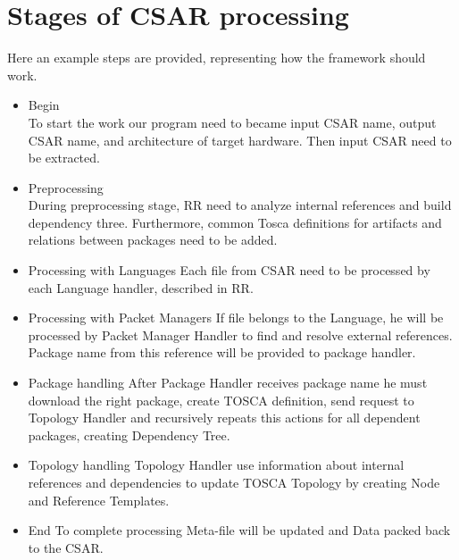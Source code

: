 \section*{Stages of CSAR processing}
Here an example steps are provided, representing how the framework should work.
\begin{itemize}  
	\item Begin  \\
	To start the work our program need to became input CSAR name, output CSAR name, and architecture of target hardware. 
	Then input CSAR need to be extracted.
	\item Preprocessing\\
	During preprocessing stage, RR need to analyze internal references and build dependency three.
	Furthermore, common Tosca definitions for artifacts and  relations between packages need to be added.
	\item Processing with Languages
	Each file from CSAR need to be processed by each Language handler, described in RR.
	\item Processing with Packet Managers
    If file belongs to the Language, he will be processed by Packet Manager Handler to find and resolve external references.
    Package name from this reference will be provided to package handler.
	\item Package handling
	After Package Handler receives package name he must download the right package, create TOSCA definition, send request to Topology Handler  and recursively repeats this actions for all dependent packages, creating Dependency Tree.
	\item Topology handling
	Topology Handler use information about internal references and dependencies to update TOSCA Topology by creating Node and Reference Templates. 
	\item End
	To complete processing Meta-file will be updated and Data packed back to the CSAR.
	
\end{itemize}